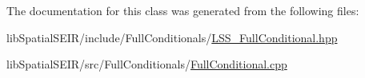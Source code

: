 The documentation for this class was generated from the following files\-:\begin{DoxyCompactItemize}
\item 
lib\-Spatial\-S\-E\-I\-R/include/\-Full\-Conditionals/\hyperlink{LSS__FullConditional_8hpp}{L\-S\-S\-\_\-\-Full\-Conditional.\-hpp}\item 
lib\-Spatial\-S\-E\-I\-R/src/\-Full\-Conditionals/\hyperlink{FullConditional_8cpp}{Full\-Conditional.\-cpp}\end{DoxyCompactItemize}
